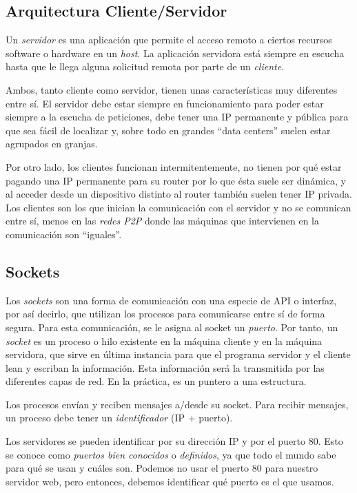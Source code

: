 \documentclass[10pt,a4paper,spanish]{report}
\begin{document}
\subsection{\textcolor{tema2}Arquitectura Cliente/Servidor}
Un \textit{\textcolor{tema2}{servidor}} es una aplicación que permite el acceso remoto a ciertos recursos software o hardware en un \textit{\textcolor{tema2}{host}}. La aplicación servidora está siempre en escucha hasta que le llega alguna solicitud remota por parte de un \textit{\textcolor{tema2}{cliente}}.

Ambos, tanto cliente como servidor, tienen unas características muy diferentes entre sí. El servidor debe estar siempre en funcionamiento para poder estar siempre a la escucha de peticiones, debe tener una IP permanente y pública para que sea fácil de localizar y, sobre todo en grandes ``data centers'' suelen estar agrupados en granjas.

Por otro lado, los clientes funcionan intermitentemente, no tienen por qué estar pagando una IP permanente para su router por lo que ésta suele ser dinámica, y al acceder desde un dispositivo distinto al router también suelen tener IP privada. Los clientes son los que inician la comunicación con el servidor y no se comunican entre sí, menos en las \textit{\textcolor{tema2}{redes P2P}} donde las máquinas que intervienen en la comunicación son ``iguales''.

\subsection{\textcolor{tema2}Sockets}
Los \textit{\textcolor{tema2}{sockets}} son una forma de comunicación con una especie de API o interfaz, por así decirlo, que utilizan los procesos para comunicarse entre sí de forma segura. Para esta comunicación, se le asigna al socket un \textit{\textcolor{tema2}{puerto}}. Por tanto, un \textit{\textcolor{tema2}{socket}} es un proceso o hilo existente en la máquina cliente y en la máquina servidora, que sirve en última instancia para que el programa servidor y el cliente lean y escriban la información. Esta información será la transmitida por las diferentes capas de red. En la práctica, es un puntero a una estructura.



Los procesos envían y reciben mensajes a/desde su socket. Para recibir mensajes, un proceso debe tener un \textit{\textcolor{tema2}{identificador}} (IP + puerto).

Los servidores se pueden identificar por su dirección IP y por el puerto 80. Esto se conoce como \textit{\textcolor{tema2}{puertos bien conocidos}} o \textit{\textcolor{tema2}{definidos}}, ya que todo el mundo sabe para qué se usan y cuáles son. Podemos no usar el puerto 80 para nuestro servidor web, pero entonces, debemos identificar qué puerto es el que usamos.
\end{document}
